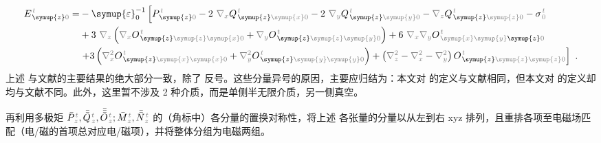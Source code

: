 \begin{subequations}
\begin{align}
	E^{\;\!\mathcolor{gray}{t}}_{\;\! \symup{z}\mathcolor{gray}{0}} = &- {\symup{\varepsilon}}_0^{-1} \left[ P^{\;\!\mathcolor{gray}{t}}_{\;\! \symup{z} \mathcolor{gray}{0}} - 2~ \mathcolor{gray}{\nabla_x} Q^{\;\!\mathcolor{gray}{t}}_{\;\! \symup{z} \mathcolor{gray}{\symup{x}} \mathcolor{gray}{0}} - 2~ \mathcolor{gray}{\nabla_y} Q^{\;\!\mathcolor{gray}{t}}_{\;\! \symup{z} \mathcolor{gray}{\symup{y}} \mathcolor{gray}{0}} - \mathcolor{gray}{\nabla_z} Q^{\;\!\mathcolor{gray}{t}}_{\;\! \symup{z} \mathcolor{gray}{\symup{z}} \mathcolor{gray}{0}} - {\sigma}^{\;\!\mathcolor{gray}{t}}_{\;\! \mathcolor{gray}{0}} \right. \label{eq:E_z0=} \\ & + 3~ \mathcolor{gray}{\nabla_z} \left( \mathcolor{gray}{\nabla_x} O^{\;\!\mathcolor{gray}{t}}_{\;\! \symup{z} \mathcolor{gray}{\symup{z}} \mathcolor{gray}{\symup{x}} \mathcolor{gray}{0}} + \mathcolor{gray}{\nabla_y} O^{\;\!\mathcolor{gray}{t}}_{\;\! \symup{z} \mathcolor{gray}{\symup{z}} \mathcolor{gray}{\symup{y}} \mathcolor{gray}{0}} \right) + 6~ \mathcolor{gray}{\nabla_x} \mathcolor{gray}{\nabla_y} O^{\;\!\mathcolor{gray}{t}}_{\;\! \mathcolor{gray}{\symup{x}} \mathcolor{gray}{\symup{y}} \symup{z} \mathcolor{gray}{0}} \\ & \left. + 3 \left( \mathcolor{gray}{\nabla_x^2} O^{\;\!\mathcolor{gray}{t}}_{\;\! \symup{z} \mathcolor{gray}{\symup{x}} \mathcolor{gray}{\symup{x}} \mathcolor{gray}{0}} + \mathcolor{gray}{\nabla_y^2} O^{\;\!\mathcolor{gray}{t}}_{\;\! \symup{z} \mathcolor{gray}{\symup{y}} \mathcolor{gray}{\symup{y}} \mathcolor{gray}{0}} \right) + \left( \mathcolor{gray}{\nabla_z^2} - \mathcolor{gray}{\nabla_x^2} - \mathcolor{gray}{\nabla_y^2} \right) O^{\;\!\mathcolor{gray}{t}}_{\;\! \symup{z} \mathcolor{gray}{\symup{z}} \mathcolor{gray}{\symup{z}} \mathcolor{gray}{0}} \right] ~.
\end{align}
\end{subequations}
上述  与文献\cite{delangeElectromagneticBoundaryConditions2013}的主要结果的绝大部分一致，除了  反号。这些分量异号的原因，主要应归结为：本文对  的定义与文献\cite{delangeElectromagneticBoundaryConditions2013}相同，但本文对  的定义却均与文献\cite{delangeElectromagneticBoundaryConditions2013}不同。此外，这里暂不涉及 2 种介质，而是单侧半无限介质，另一侧真空。

再利用多极矩 $\bar{P}^{\;\!\mathcolor{gray}{t}}_{\;\!\mathcolor{gray}{z}},\bar{\bar{Q}}^{\;\!\mathcolor{gray}{t}}_{\;\!\mathcolor{gray}{z}},\bar{\bar{\bar{O}}}^{\;\!\mathcolor{gray}{t}}_{\;\!\mathcolor{gray}{z}} ; \bar{M}^{\;\!\mathcolor{gray}{t}}_{\;\!\mathcolor{gray}{z}}, \bar{\bar{N}}^{\;\!\mathcolor{gray}{t}}_{\;\!\mathcolor{gray}{z}}$ 的（角标中）各分量的置换对称性，将上述  各张量的分量以从左到右 xyz 排列，且重排各项至电磁场匹配（电/磁的首项总对应电/磁项），并将整体分组为电磁两组。

